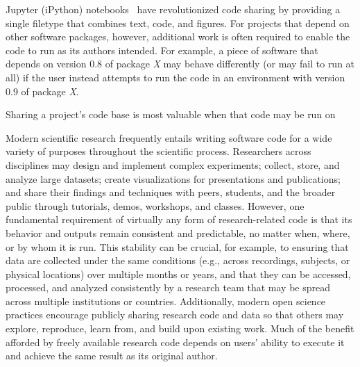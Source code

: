 \documentclass[preprint,12pt, a4paper]{elsarticle}
\begin{document}
Jupyter (iPython) notebooks~\citep{KluyEtal16} have revolutionized
code sharing by providing a single filetype that combines text, code,
and figures.  For projects that depend on other software packages,
however, additional work is often required to enable the code to run
as its authors intended.  For example, a piece of software that
depends on version 0.8 of package \textit{X} may behave differently
(or may fail to run at all) if the user instead attempts to run the
code in an environment with version 0.9 of package \textit{X}.




Sharing a project's code base is most valuable when that code may be
run on 



Modern scientific research frequently entails writing software code
for a wide variety of purposes throughout the scientific process.
Researchers across disciplines may design and implement complex
experiments; collect, store, and analyze large datasets; create
visualizations for presentations and publications; and share their
findings and techniques with peers, students, and the broader public
through tutorials, demos, workshops, and classes.  However, one
fundamental requirement of virtually any form of research-related code
is that its behavior and outputs remain consistent and predictable, no
matter when, where, or by whom it is run.  This stability can be
crucial, for example, to ensuring that data are collected under the
same conditions (e.g., across recordings, subjects, or physical
locations)
over multiple months or years, and that they can be accessed,
processed, and analyzed consistently by a research team that may be
spread across multiple institutions or countries.  Additionally,
modern open science practices encourage publicly sharing research code
and data so that others may explore, reproduce, learn from, and build
upon existing work.  Much of the benefit afforded by freely available
research code depends on users' ability to execute it and achieve the
same result as its original author.
\end{document}
